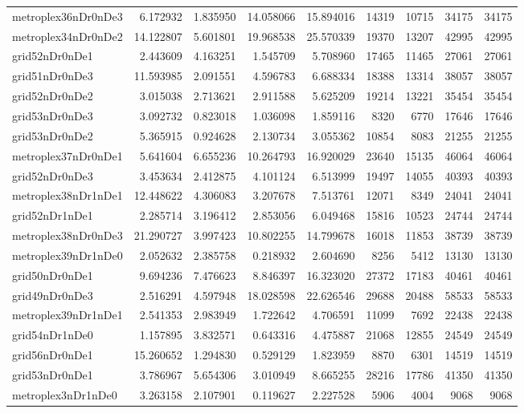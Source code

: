 \begin{longtable}{|l|r|r|r|r|r|r|r|r|}
metroplex36nDr0nDe3 & 6.172932 & 1.835950 & 14.058066 & 15.894016 & 14319 & 10715 & 34175 & 34175 \\
metroplex34nDr0nDe2 & 14.122807 & 5.601801 & 19.968538 & 25.570339 & 19370 & 13207 & 42995 & 42995 \\
grid52nDr0nDe1 & 2.443609 & 4.163251 & 1.545709 & 5.708960 & 17465 & 11465 & 27061 & 27061 \\
grid51nDr0nDe3 & 11.593985 & 2.091551 & 4.596783 & 6.688334 & 18388 & 13314 & 38057 & 38057 \\
grid52nDr0nDe2 & 3.015038 & 2.713621 & 2.911588 & 5.625209 & 19214 & 13221 & 35454 & 35454 \\
grid53nDr0nDe3 & 3.092732 & 0.823018 & 1.036098 & 1.859116 & 8320 & 6770 & 17646 & 17646 \\
grid53nDr0nDe2 & 5.365915 & 0.924628 & 2.130734 & 3.055362 & 10854 & 8083 & 21255 & 21255 \\
metroplex37nDr0nDe1 & 5.641604 & 6.655236 & 10.264793 & 16.920029 & 23640 & 15135 & 46064 & 46064 \\
grid52nDr0nDe3 & 3.453634 & 2.412875 & 4.101124 & 6.513999 & 19497 & 14055 & 40393 & 40393 \\
metroplex38nDr1nDe1 & 12.448622 & 4.306083 & 3.207678 & 7.513761 & 12071 & 8349 & 24041 & 24041 \\
grid52nDr1nDe1 & 2.285714 & 3.196412 & 2.853056 & 6.049468 & 15816 & 10523 & 24744 & 24744 \\
metroplex38nDr0nDe3 & 21.290727 & 3.997423 & 10.802255 & 14.799678 & 16018 & 11853 & 38739 & 38739 \\
metroplex39nDr1nDe0 & 2.052632 & 2.385758 & 0.218932 & 2.604690 & 8256 & 5412 & 13130 & 13130 \\
grid50nDr0nDe1 & 9.694236 & 7.476623 & 8.846397 & 16.323020 & 27372 & 17183 & 40461 & 40461 \\
grid49nDr0nDe3 & 2.516291 & 4.597948 & 18.028598 & 22.626546 & 29688 & 20488 & 58533 & 58533 \\
metroplex39nDr1nDe1 & 2.541353 & 2.983949 & 1.722642 & 4.706591 & 11099 & 7692 & 22438 & 22438 \\
grid54nDr1nDe0 & 1.157895 & 3.832571 & 0.643316 & 4.475887 & 21068 & 12855 & 24549 & 24549 \\
grid56nDr0nDe1 & 15.260652 & 1.294830 & 0.529129 & 1.823959 & 8870 & 6301 & 14519 & 14519 \\
grid53nDr0nDe1 & 3.786967 & 5.654306 & 3.010949 & 8.665255 & 28216 & 17786 & 41350 & 41350 \\
metroplex3nDr1nDe0 & 3.263158 & 2.107901 & 0.119627 & 2.227528 & 5906 & 4004 & 9068 & 9068 \\

\end{longtable}
